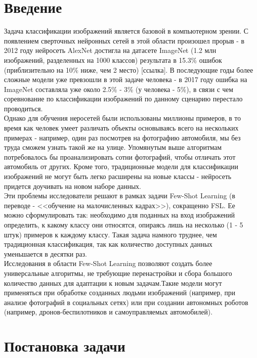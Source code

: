\documentclass[a4paper, 12pt]{report}
\begin{document}
	\tableofcontents

\chapter{Введение}

Задача классификации изображений является базовой в компьютерном зрении. С появлением сверточных нейронных сетей в этой области произошел прорыв - в 2012 году нейросеть AlexNet достигла на датасете ImageNet (1.2 млн изображений, разделенных на 1000 классов) результата в 15.3\% ошибок (приблизительно на 10\% ниже, чем 2 место) [ссылка]. В последующие годы более сложные модели уже превзошли в этой задаче человека - в 2017 году ошибка на ImageNet составляла уже около 2.5\% - 3\% (у человека - 5\%), в связи с чем соревнование по классификации изображений по данному сценарию перестало проводиться. \\

Однако для обучения неросетей были использованы миллионы примеров, в то время как человек умеет различать объекты основываясь всего на нескольких примерах - например, один раз посмотрев на фотографию автомобиля, мы без труда сможем узнать такой же на улице. Упомянутым выше алгоритмам потребовалось бы проанализировать сотни фотографий, чтобы отличать этот автомобиль от других. Кроме того, традиционные модели для классификации изображений не могут быть легко расширены на новые классы - нейросеть придется доучивать на новом наборе данных. \\

Эти проблемы исследователи решают в рамках задачи Few-Shot Learning (в переводе - <<обучение на малочисленных кадрах>>), сокращенно FSL. Ее можно сформулировать так: необходимо для поданных на вход изображений определить, к какому классу они относятся, опираясь лишь на несколько (1 - 5 штук) примеров к каждому классу. Такая задача намного труднее, чем традиционная классификация, так как количество доступных данных уменьшается в десятки раз. \\

Исследования в области Few-Shot Learning позволяют создать более универсальные алгоритмы, не требующие перенастройки и сбора большого количество данных для адаптации к новым задачам.Такие модели могут применяться при обработке созданных людьми изображений (например, при анализе фотографий в социальных сетях) или при создании автономных роботов (например, дронов-беспилотников и самоуправляемых автомобилей).

\chapter{Постановка задачи}
\end{document}
